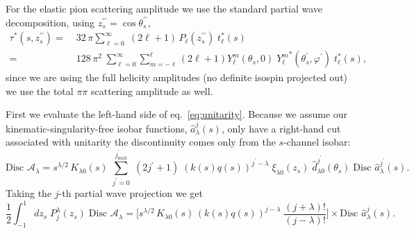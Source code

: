 \documentclass[10pt, aps,prd,amsmath,amssymb,superscriptaddress,onecolumn,
nofootinbib,showpacs,preprintnumbers]{revtex4-1}
\newcommand{\jpmax}{{j^\prime_\text{max}}}
\newcommand{\Disc}{\text{Disc }}
\begin{document}
For the elastic pion scattering amplitude we use the standard partial wave decomposition, using \( z_s^{\prime\prime} = \cos \theta_s^{\prime\prime}\),
  \begin{align}
    \label{eq:elastic-pion}
    \tau^*(s, z_s^{\prime\prime}) =& \; 32 \, \pi \sum_{\ell=0  }^\infty \; (2\ell+1) \, P_{\ell}(z_s^{\prime\prime}) \; t_\ell^*(s) \nonumber \\
    =& \; 128 \, \pi^2 \; \sum_{\ell=0}^\infty \sum_{m=-\ell}^{\ell} (2\ell +1 ) Y^m_\ell(\theta_s,0) \; {Y^m_\ell}^*(\theta_s^\prime, \varphi^\prime) \; t_\ell^*(s),
  \end{align}
since we are using the full helicity amplitudes (no definite isospin projected out) we use the total \(\pi\pi\) scattering amplitude as well.

First we evaluate the left-hand side of eq.~\ref{eq:unitarity}. Because we assume our kinematic-singularity-free isobar functions, \(\hat{a}_\lambda^j(s)\), only have a right-hand cut associated with unitarity the discontinuity comes only from the \(s\)-channel isobar:
  \begin{equation}
    \label{eq:discontinuity}
    \Disc \mathcal{A}_\lambda = s^{\lambda/2}\, K_{\lambda 0}(s) \; \sum_{j^\prime=0}^\jpmax \; (2 j^\prime +1) \; (k(s)q(s))^{j^\prime-\lambda}  \; \xi_{\lambda 0}(z_s)
    \; \hat{d}^{j^\prime}_{\lambda 0}(\theta_s) \; \Disc \hat{a}_\lambda^{j^\prime}(s).
  \end{equation}
Taking the \(j\)-th partial wave projection we get
  \begin{equation}
    \label{eq:pw-disc}
    \frac{1}{2} \int_{-1}^1 dz_s \; P^\lambda_{j}(z_s) \; \Disc \mathcal{A}_\lambda =
    \bigg[ s^{\lambda/2} \, K_{\lambda 0}(s) \, (k(s)q(s))^{j-\lambda} \; \frac{(j+\lambda)!}{(j-
    \lambda)!} \bigg] \times \Disc \hat{a}^j_\lambda(s).
  \end{equation}
\end{document}
